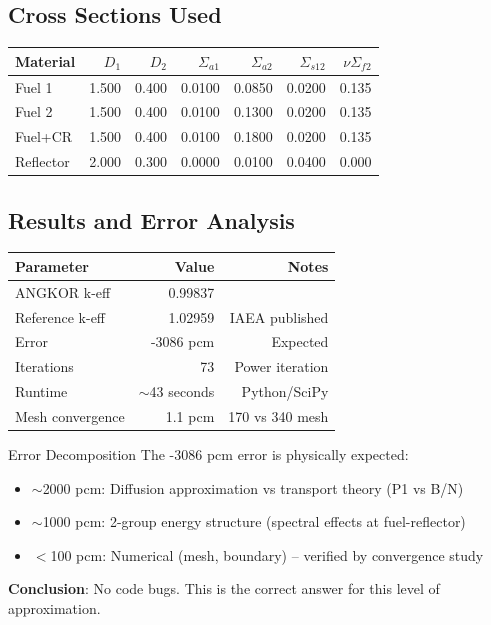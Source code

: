 \documentclass[12pt,a4paper]{article}
\begin{document}
\subsection{Cross Sections Used}

\begin{center}
\begin{tabular}{lrrrrrr}
\toprule
Material & $D_1$ & $D_2$ & $\Sigma_{a1}$ & $\Sigma_{a2}$
         & $\Sigma_{s12}$ & $\nu\Sigma_{f2}$ \\
\midrule
Fuel 1   & 1.500 & 0.400 & 0.0100 & 0.0850 & 0.0200 & 0.135 \\
Fuel 2   & 1.500 & 0.400 & 0.0100 & 0.1300 & 0.0200 & 0.135 \\
Fuel+CR  & 1.500 & 0.400 & 0.0100 & 0.1800 & 0.0200 & 0.135 \\
Reflector& 2.000 & 0.300 & 0.0000 & 0.0100 & 0.0400 & 0.000 \\
\bottomrule
\end{tabular}
\end{center}

\subsection{Results and Error Analysis}

\begin{center}
\begin{tabular}{lrr}
\toprule
Parameter & Value & Notes \\
\midrule
ANGKOR k-eff & 0.99837 & \\
Reference k-eff & 1.02959 & IAEA published \\
Error & -3086 pcm & Expected \\
Iterations & 73 & Power iteration \\
Runtime & $\sim$43 seconds & Python/SciPy \\
Mesh convergence & 1.1 pcm & 170 vs 340 mesh \\
\bottomrule
\end{tabular}
\end{center}

\begin{physicsbox}{Error Decomposition}
The -3086 pcm error is physically expected:
\begin{itemize}
  \item $\sim$2000 pcm: Diffusion approximation vs transport theory (P1 vs B/N)
  \item $\sim$1000 pcm: 2-group energy structure (spectral effects at fuel-reflector)
  \item $<$100 pcm: Numerical (mesh, boundary) -- verified by convergence study
\end{itemize}
\textbf{Conclusion}: No code bugs. This is the correct answer for this level of approximation.
\end{physicsbox}
\end{document}
